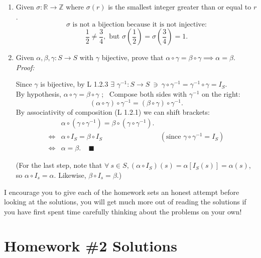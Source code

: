 \begin{enumerate}
    \item Given $\sigma: \mathbb{R} \to \mathbb{Z}$ where $\sigma(r)$ is the smallest integer greater than or equal to $r$.  
          \[
          \sigma \text{ is not a bijection because it is not injective:}
          \]
          \[
          \frac{1}{2} \neq \frac{3}{4}, \text{ but } \sigma\left(\frac{1}{2}\right) = \sigma\left(\frac{3}{4}\right) = 1.
          \]

    \item Given $\alpha, \beta, \gamma: S \to S$ with $\gamma$ bijective, prove that $\alpha \circ \gamma = \beta \circ \gamma \implies \alpha = \beta$.  \\
          \textit{Proof:}  
          
              Since $\gamma$ is bijective, by L 1.2.3 $\exists$ $\gamma^{-1}: S \to S \ \ni \ \gamma \circ \gamma^{-1} = \gamma^{-1} \circ \gamma = I_S$. \\
              By hypothesis, $\alpha \circ \gamma = \beta \circ \gamma$ ; \ 
              Compose both sides with $\gamma^{-1}$ on the right:
                    \[
                    (\alpha \circ \gamma) \circ \gamma^{-1} = (\beta \circ \gamma) \circ \gamma^{-1}.
                    \]
              By associativity of composition (L 1.2.1) we can shift brackets:
              \begin{align*}
                &\alpha \circ (\gamma \circ \gamma^{-1}) = \beta \circ (\gamma \circ \gamma^{-1}). &\\
                \iff &\alpha \circ I_S = \beta \circ I_S & (\text{since }\gamma \circ \gamma^{-1} = I_S) \\
                \iff &\alpha = \beta. \ \ \ \ \ \blacksquare &
              \end{align*}
                    
              (For the last step, note that $\forall \ s\in S, (\alpha \circ I_S)(s) = \alpha[I_S(s)]=\alpha(s)$, so $\alpha \circ I_s = \alpha$. Likewise, $\beta \circ I_s =\beta$.)
          
\end{enumerate}


\newpage

\begin{tcolorbox}
    I encourage you to give each of the homework sets an honest attempt before looking at the solutions, you will get much more out of reading the solutions if you have first spent time carefully thinking about the problems on your own!
\end{tcolorbox}
\vspace{-0.2in}
\section{Homework \#2 Solutions}
